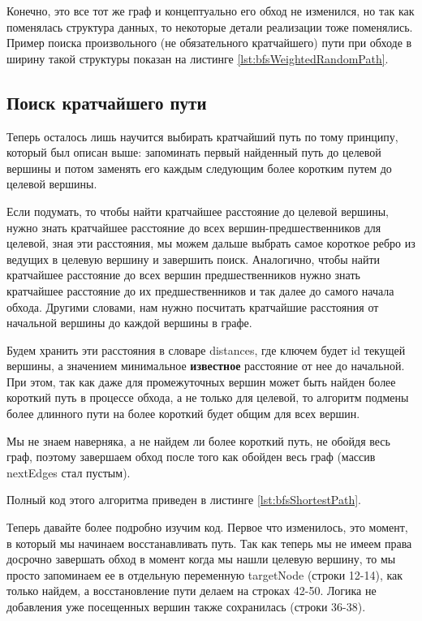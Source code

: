 \documentclass[../article.tex]{subfiles}
\begin{document}
Конечно, это все тот же граф и концептуально его обход не изменился, но так как поменялась структура данных, то некоторые детали реализации тоже поменялись. Пример поиска произвольного (не обязательного кратчайшего) пути при обходе в ширину такой структуры показан на листинге \ref{lst:bfsWeightedRandomPath}.

\subsection{Поиск кратчайшего пути}

Теперь осталось лишь научится выбирать кратчайший путь по тому принципу, который был описан выше: запоминать первый найденный путь до целевой вершины и потом заменять его каждым следующим более коротким путем до целевой вершины.

Если подумать, то чтобы найти кратчайшее расстояние до целевой вершины, нужно знать кратчайшее расстояние до всех вершин-предшественников для целевой, зная эти расстояния, мы можем дальше выбрать самое короткое ребро из ведущих в целевую вершину и завершить поиск. Аналогично, чтобы найти кратчайшее расстояние до всех вершин предшественников нужно знать кратчайшее расстояние до их предшественников и так далее до самого начала обхода. Другими словами, нам нужно посчитать кратчайшие расстояния от начальной вершины до каждой вершины в графе.

Будем хранить эти расстояния в словаре {\firacodebold distances}, где ключем будет {\firacodebold id} текущей вершины, а значением минимальное {\bfseries известное} расстояние от нее до начальной. При этом, так как даже для промежуточных вершин может быть найден более короткий путь в процессе обхода, а не только для целевой, то алгоритм подмены более длинного пути на более короткий будет общим для всех вершин.

Мы не знаем наверняка, а не найдем ли более короткий путь, не обойдя весь граф, поэтому завершаем обход после того как обойден весь граф (массив {\firacodebold nextEdges} стал пустым).

Полный код этого алгоритма приведен в листинге \ref{lst:bfsShortestPath}.


Теперь давайте более подробно изучим код. Первое что изменилось, это момент, в который мы начинаем восстанавливать путь. Так как теперь мы не имеем права досрочно завершать обход в момент когда мы нашли целевую вершину, то мы просто запоминаем ее в отдельную переменную {\firacodebold targetNode} (строки 12-14), как только найдем, а восстановление пути делаем на строках 42-50. Логика не добавления уже посещенных вершин также сохранилась (строки 36-38).
\end{document}
